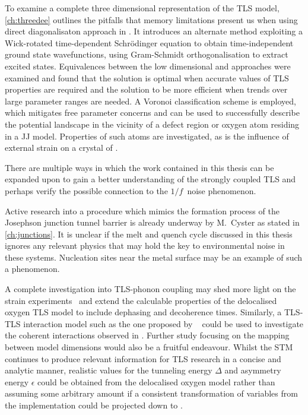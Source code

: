 To examine a complete three dimensional representation of the TLS model, \cref{ch:threedee} outlines the pitfalls that memory limitations present us when using direct diagonalisaton approach in .
It introduces an alternate method exploiting a Wick-rotated time-dependent Schrödinger equation to obtain time-independent ground state wavefunctions, using Gram-Schmidt orthogonalisation to extract excited states.
Equivalences between the low dimensional and  approaches were examined and found that the  solution is optimal when accurate values of TLS properties are required and the  solution to be more efficient when trends over large parameter ranges are needed.
A Voronoi classification scheme is employed, which mitigates free parameter concerns and can be used to successfully describe the potential landscape in the vicinity of a defect region or oxygen atom residing in a JJ model.
Properties of such atoms are investigated, as is the influence of external strain on a crystal of .

\divtext

There are multiple ways in which the work contained in this thesis can be expanded upon to gain a better understanding of the strongly coupled TLS and perhaps verify the possible connection to the $1/f\,$ noise phenomenon.

Active research into a procedure which mimics the formation process of the Josephson junction tunnel barrier is already underway by M.~Cyster as stated in \cref{ch:junctions}.
It is unclear if the melt and quench cycle discussed in this thesis ignores any relevant physics that may hold the key to environmental noise in these systems.
Nucleation sites near the metal surface may be an example of such a phenomenon.

A complete investigation into TLS-phonon coupling may shed more light on the strain experiments~\cite{Grabovskij2012} and extend the calculable properties of the delocalised oxygen TLS model to include dephasing and decoherence times.
Similarly, a TLS-TLS interaction model such as the one proposed by \citeauthor{Faoro2014}~\cite{Faoro2014} could be used to investigate the coherent interactions observed in .
Further study focusing on the mapping between model dimensions would also be a fruitful endeavour.
Whilst the STM continues to produce relevant information for TLS research in a concise and analytic manner, realistic values for the tunneling energy $\Delta$ and asymmetry energy $\epsilon$ could be obtained from the delocalised oxygen model rather than assuming some arbitrary amount if a consistent transformation of variables from the  implementation could be projected down to .

